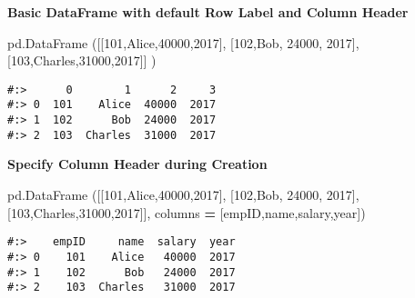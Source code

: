 \documentclass[
]{book}
\newenvironment{Shaded}{\begin{snugshade}}{\end{snugshade}}
\newcommand{\DecValTok}[1]{\textcolor[rgb]{0.06,0.06,0.06}{#1}}
\newcommand{\NormalTok}[1]{#1}
\newcommand{\OperatorTok}[1]{\textcolor[rgb]{0.43,0.43,0.43}{\textbf{#1}}}
\newcommand{\StringTok}[1]{\textcolor[rgb]{0.5,0.5,0.5}{#1}}
\begin{document}
\textbf{Basic DataFrame with default Row Label and Column Header}

\begin{Shaded}
\begin{Highlighting}[]
\NormalTok{pd.DataFrame ([[}\DecValTok{101}\NormalTok{,}\StringTok{\textquotesingle{}Alice\textquotesingle{}}\NormalTok{,}\DecValTok{40000}\NormalTok{,}\DecValTok{2017}\NormalTok{],}
\NormalTok{               [}\DecValTok{102}\NormalTok{,}\StringTok{\textquotesingle{}Bob\textquotesingle{}}\NormalTok{,  }\DecValTok{24000}\NormalTok{, }\DecValTok{2017}\NormalTok{], }
\NormalTok{               [}\DecValTok{103}\NormalTok{,}\StringTok{\textquotesingle{}Charles\textquotesingle{}}\NormalTok{,}\DecValTok{31000}\NormalTok{,}\DecValTok{2017}\NormalTok{]] )}
\end{Highlighting}
\end{Shaded}

\begin{verbatim}
#:>      0        1      2     3
#:> 0  101    Alice  40000  2017
#:> 1  102      Bob  24000  2017
#:> 2  103  Charles  31000  2017
\end{verbatim}

\textbf{Specify Column Header during Creation}

\begin{Shaded}
\begin{Highlighting}[]
\NormalTok{pd.DataFrame ([[}\DecValTok{101}\NormalTok{,}\StringTok{\textquotesingle{}Alice\textquotesingle{}}\NormalTok{,}\DecValTok{40000}\NormalTok{,}\DecValTok{2017}\NormalTok{],}
\NormalTok{               [}\DecValTok{102}\NormalTok{,}\StringTok{\textquotesingle{}Bob\textquotesingle{}}\NormalTok{,  }\DecValTok{24000}\NormalTok{, }\DecValTok{2017}\NormalTok{], }
\NormalTok{               [}\DecValTok{103}\NormalTok{,}\StringTok{\textquotesingle{}Charles\textquotesingle{}}\NormalTok{,}\DecValTok{31000}\NormalTok{,}\DecValTok{2017}\NormalTok{]], columns }\OperatorTok{=}\NormalTok{ [}\StringTok{\textquotesingle{}empID\textquotesingle{}}\NormalTok{,}\StringTok{\textquotesingle{}name\textquotesingle{}}\NormalTok{,}\StringTok{\textquotesingle{}salary\textquotesingle{}}\NormalTok{,}\StringTok{\textquotesingle{}year\textquotesingle{}}\NormalTok{])}
\end{Highlighting}
\end{Shaded}

\begin{verbatim}
#:>    empID     name  salary  year
#:> 0    101    Alice   40000  2017
#:> 1    102      Bob   24000  2017
#:> 2    103  Charles   31000  2017
\end{verbatim}
\end{document}
